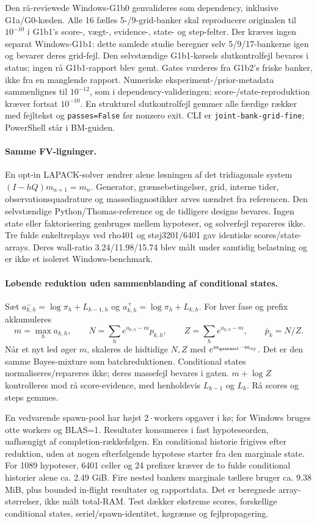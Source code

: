 Den rå-reviewede Windows-G1b0 genvalideres som dependency, inklusive
G1a/G0-kæden. Alle 16 fælles 5-/9-grid-banker skal reproducere originalen
til \(10^{-10}\) i G1b1's score-, vægt-, evidence-, state- og step-felter.
Der kræves ingen separat Windows-G1b1: dette samlede studie beregner selv
5/9/17-bankerne igen og bevarer deres grid-fejl. Den selvstændige
G1b1-kørsels slutkontrolfejl bevares i status; ingen rå G1b1-rapport blev
gemt. Gates vurderes fra G1b2's friske banker, ikke fra en manglende rapport.
Numeriske eksperiment-/prior-metadata sammenlignes til \(10^{-12}\), som
i dependency-valideringen; score-/state-reproduktion kræver fortsat
\(10^{-10}\). En strukturel slutkontrolfejl gemmer alle færdige rækker med
fejltekst og \texttt{passes=False} før nonzero exit.
CLI er \texttt{joint-bank-grid-fine}; PowerShell står i BM-guiden.

\paragraph{Samme FV-ligninger.}
En opt-in LAPACK-solver ændrer alene løsningen af det tridiagonale system
\((I-hQ)m_{n+1}=m_n\). Generator, grænsebetingelser, grid, interne tider,
observationsquadrature og massediagnostikker arves uændret fra referencen.
Den selvstændige Python/Thomas-reference og de tidligere designs bevares.
Ingen state eller faktorisering genbruges mellem hypoteser, og solverfejl
repareres ikke. Tre fulde enkeltreplays ved rho401 og støj3201/6401 gav
identiske scores/state-arrays. Deres wall-ratio 3.24/11.98/15.74 blev målt
under samtidig belastning og er ikke et isoleret Windows-benchmark.

\paragraph{Løbende reduktion uden sammenblanding af conditional states.}
Sæt \(a_{k,h}^{-}=\log\pi_h+L_{k-1,h}\) og
\(a_{k,h}^{+}=\log\pi_h+L_{k,h}\). For hver fase og prefix akkumuleres
\[
 m=\max_h a_{k,h},\qquad
 N=\sum_h e^{a_{k,h}-m}p_{k,h},\qquad
 Z=\sum_h e^{a_{k,h}-m},\qquad \bar p_k=N/Z.
\]
Når et nyt led øger \(m\), skaleres de hidtidige \(N,Z\) med
\(e^{m_{\rm gammel}-m_{\rm ny}}\). Det er den samme Bayes-mixture som
batchreduktionen. Conditional states normaliseres/repareres ikke; deres
massefejl bevares i gaten. \(m+\log Z\) kontrolleres mod rå score-evidence,
med henholdsvis \(L_{k-1}\) og \(L_k\). Rå scores og steps gemmes.

En vedvarende spawn-pool har højst \(2\cdot\mathrm{workers}\) opgaver
i kø; for Windows bruges otte workers og BLAS=1. Resultater konsumeres
i fast hypoteseorden, uafhængigt af completion-rækkefølgen. En conditional
historie frigives efter reduktion, uden at nogen efterfølgende hypotese
starter fra den marginale state. For 1089 hypoteser, 6401 celler og 24
prefixer kræver de to fulde conditional historier alene ca. 2.49 GiB.
Fire nested bankers marginale tællere bruger ca. 9.38 MiB, plus bounded
in-flight resultater og rapportdata. Det er beregnede array-størrelser,
ikke målt total-RAM. Test dækker ekstreme scores, forskellige conditional
states, seriel/spawn-identitet, køgrænse og fejlpropagering.

